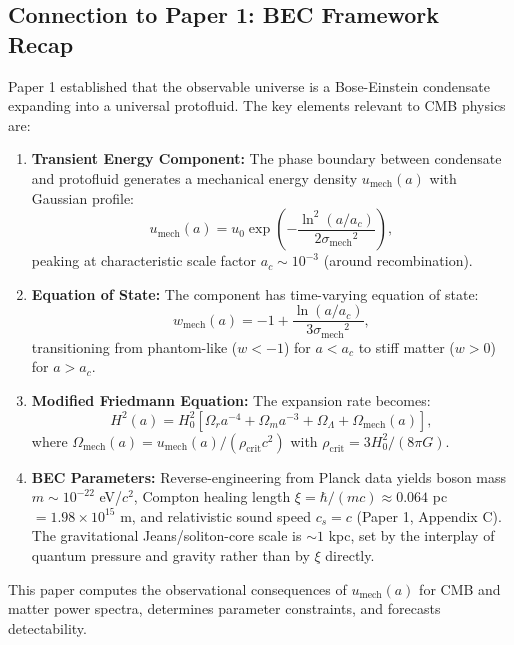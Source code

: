 \documentclass[11pt,a4paper]{article}
\newcommand{\rhocrit}{\ensuremath{\rho_{\mathrm{crit}}}}
\newcommand{\umech}{\ensuremath{u_{\mathrm{mech}}}}
\newcommand{\wmech}{\ensuremath{w_{\mathrm{mech}}}}
\newcommand{\ac}{\ensuremath{a_c}}
\newcommand{\sigmamech}{\ensuremath{\sigma_{\mathrm{mech}}}}
\newcommand{\Omm}{\ensuremath{\Omega_m}}
\newcommand{\Omr}{\ensuremath{\Omega_r}}
\newcommand{\OmL}{\ensuremath{\Omega_\Lambda}}
\theoremstyle{definition}
\theoremstyle{remark}
\begin{document}
\subsection{Connection to Paper 1: BEC Framework Recap}
\label{sec:framework_recap}

Paper 1 established that the observable universe is a Bose-Einstein condensate expanding into a universal protofluid. The key elements relevant to CMB physics are:

\begin{enumerate}[leftmargin=*, itemsep=0.3em]
\item \textbf{Transient Energy Component:} The phase boundary between condensate and protofluid generates a mechanical energy density $\umech(a)$ with Gaussian profile:
\begin{equation}
\label{eq:umech_profile}
\umech(a) = u_0 \exp\left( -\frac{\ln^2(a/\ac)}{2\sigmamech^2} \right),
\end{equation}
peaking at characteristic scale factor $\ac \sim 10^{-3}$ (around recombination).

\item \textbf{Equation of State:} The component has time-varying equation of state:
\begin{equation}
\label{eq:wmech}
\wmech(a) = -1 + \frac{\ln(a/\ac)}{3\sigmamech^2},
\end{equation}
transitioning from phantom-like ($w < -1$) for $a < \ac$ to stiff matter ($w > 0$) for $a > \ac$.

\item \textbf{Modified Friedmann Equation:} The expansion rate becomes:
\begin{equation}
\label{eq:friedmann_modified}
H^2(a) = H_0^2 \left[ \Omr a^{-4} + \Omm a^{-3} + \OmL + \Omega_{\mathrm{mech}}(a) \right],
\end{equation}
where $\Omega_{\mathrm{mech}}(a) = \umech(a)/(\rhocrit c^2)$ with $\rhocrit = 3H_0^2/(8\pi G)$.

\item \textbf{BEC Parameters:} Reverse-engineering from Planck data yields boson mass $m \sim 10^{-22}$ eV/$c^2$, Compton healing length $\xi = \hbar/(mc) \approx 0.064$ pc $= 1.98 \times 10^{15}$ m, and relativistic sound speed $c_s = c$ (Paper 1, Appendix C). The gravitational Jeans/soliton-core scale is $\sim 1$ kpc, set by the interplay of quantum pressure and gravity rather than by $\xi$ directly.
\end{enumerate}

This paper computes the observational consequences of $\umech(a)$ for CMB and matter power spectra, determines parameter constraints, and forecasts detectability.
\end{document}
